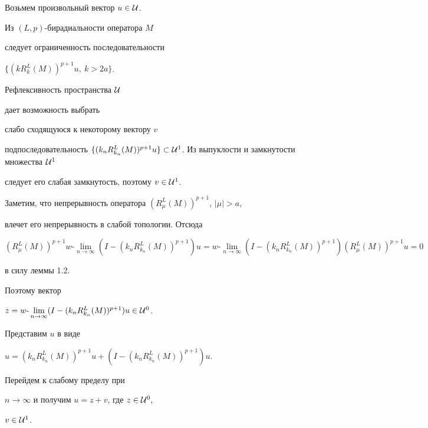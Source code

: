 \begin{pf}


Возьмем произвольный вектор $u\in {\cal U}$.


Из  $(L,p)$-бирадиальности оператора $M$


следует ограниченность последовательности


$\{ (kR_k^L(M))^{p+1}u,\ k>2a\}$.


Рефлексивность пространства ${\cal U}$


дает возможность выбрать


слабо сходящуюся к некоторому вектору $v$


подпоследовательность $\{ (k_nR_{k_n}^L(M))^{p+1}u\}\subset


{\cal U}^1$. Из выпуклости и замкнутости множества ${\cal U}^1$


следует его слабая замкнутость, поэтому $v\in {\cal U}^1$.





Заметим, что непрерывность оператора $(R_{\mu }^L(M))^{p+1}$, $|\mu |>a$,


влечет его непрерывность в слабой топологии. Отсюда


$$


(R_{\mu }^L(M))^{p+1}w\text{-}\lim\limits_{n\to\infty}


(I-(k_nR_{k_n}^L(M))^{p+1})u=


w\text{-}\lim_{n\to\infty}(I-(k_nR_{k_n}^L(M))^{p+1})


(R_{\mu }^L(M))^{p+1}u=0


$$


в силу леммы 1.2.


Поэтому вектор


$z=w\text{-}\lim\limits_{n\to\infty}(I-(k_nR_{k_n}^L(M))^{p+1})u


\in {\cal U}^0$.





Представим $u$ в виде


$u=(k_nR_{k_n}^L(M))^{p+1}u+(I-(k_nR_{k_n}^L(M))^{p+1})u$.


Перейдем к слабому пределу при


$n\to\infty $ и получим $u=z+v$, где $z\in {\cal U}^0,$


$v\in {\cal U}^1$.


\end{pf}






